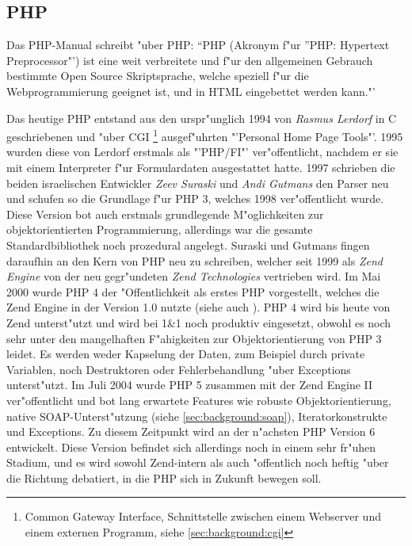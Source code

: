 \subsection{PHP}
\label{sec:background:php}

Das PHP-Manual \cite{PHPMAN} schreibt "uber PHP: "`PHP (Akronym f"ur "'PHP: Hypertext Preprocessor"') 
ist eine weit verbreitete und f"ur den allgemeinen Gebrauch bestimmte Open Source Skriptsprache, 
welche speziell f"ur die Webprogrammierung geeignet ist, und in HTML eingebettet werden kann."'

Das heutige PHP entstand aus den urspr"unglich 1994 von \emph{Rasmus Lerdorf} in C geschriebenen und "uber CGI
\footnote{Common Gateway Interface, Schnittstelle zwischen einem Webserver und einem externen Programm, siehe \ref{sec:background:cgi}}
ausgef"uhrten "'Personal Home Page Tools"'. 1995 wurden diese von Lerdorf erstmals als "'PHP/FI"' ver"offentlicht,
nachdem er sie mit einem Interpreter f"ur Formulardaten ausgestattet hatte.
1997 schrieben die beiden israelischen Entwickler \emph{Zeev Suraski} und \emph{Andi Gutmans} den Parser neu und
schufen so die Grundlage f"ur PHP 3, welches 1998 ver"offentlicht wurde. Diese Version bot auch 
erstmals grundlegende M"oglichkeiten zur objektorientierten Programmierung, allerdings war die gesamte 
Standardbibliothek noch prozedural angelegt.
Suraski und Gutmans fingen daraufhin an den Kern von PHP neu zu schreiben, welcher seit 1999 als \emph{Zend Engine}
von der neu gegr"undeten \emph{Zend Technologies} vertrieben wird. Im Mai 2000 wurde PHP 4 der
"Offentlichkeit als erstes PHP vorgestellt, welches die Zend Engine in der Version 1.0 nutzte (siehe auch \cite{ZENDENGINE}).
PHP 4 wird bis heute von Zend unterst"utzt und wird bei 1\&1 noch produktiv eingesetzt, obwohl es noch sehr unter den
mangelhaften F"ahigkeiten zur Objektorientierung von PHP 3 leidet. Es werden weder Kapselung der Daten,  
zum Beispiel durch private Variablen, noch Destruktoren oder Fehlerbehandlung "uber Exceptions unterst"utzt.
Im Juli 2004 wurde PHP 5 zusammen mit der Zend Engine II ver"offentlicht und bot lang erwartete Features wie
robuste Objektorientierung, native SOAP-Unterst"utzung (siehe \ref{sec:background:soap}), 
Iteratorkonstrukte und Exceptions. Zu diesem Zeitpunkt wird an der n"achsten PHP Version 6 entwickelt. Diese Version
befindet sich allerdings noch in einem sehr fr"uhen Stadium, und es wird sowohl Zend-intern als auch "offentlich noch heftig 
"uber die Richtung debatiert, in die PHP sich in Zukunft bewegen soll.  

